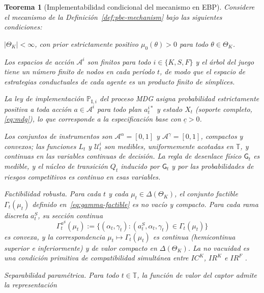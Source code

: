 \documentclass[review,authoryear,12pt]{elsarticle}
\theoremstyle{plain}
\newtheorem{theorem}{Teorema}
\theoremstyle{definition}
\newcommand{\ThetaK}{\Theta_K}
\newcommand{\1}{\mathbf{1}}
\newcommand{\ProbI}[1]{\mathbb{P}_{\mathrm{I},#1}}
\begin{document}
\begin{theorem}[Implementabilidad condicional del mecanismo en EBP]\label{thm:ebp-implementabilidad}
\normalfont
Considere el mecanismo de la Definición~\ref{def:pbe-mechanism} bajo las siguientes condiciones:
\begin{list}{}{\setlength{\labelwidth}{2.6em}\setlength{\labelsep}{0.7em}\setlength{\leftmargin}{3.3em}\setlength{\itemindent}{0pt}\setlength{\listparindent}{0pt}\setlength{\parsep}{0pt}\setlength{\itemsep}{0.35\baselineskip}}
  \item[\textup{(i)}] $|\ThetaK|<\infty$, con prior estrictamente positivo $\mu_0(\theta)>0$ para todo $\theta\in\ThetaK$.
  \item[\textup{(ii)}] Los espacios de acción $\mathcal{A}^i$ son finitos para todo $i\in\{K,S,F\}$ y el árbol del juego tiene un número finito de nodos en cada período $t$, de modo que el espacio de estrategias conductuales de cada agente es un producto finito de símplices.
  \item[\textup{(iii)}] La ley de implementación $\ProbI{i}$ del proceso MDG asigna probabilidad estrictamente positiva a toda acción $a\in\mathcal{A}^i$ para todo plan $a_t^{i\ast}$ y estado $X_t$ \textup{(}soporte completo, \eqref{eq:mdg}\textup{)}, lo que corresponde a la especificación base con $\underline{c}>0$.
  \item[\textup{(iv)}] Los conjuntos de instrumentos son $\mathcal{A}^{\alpha}=[0,1]$ y $\mathcal{A}^{\gamma}=[0,1]$, compactos y convexos; las funciones $L_t$ y $\mathcal{U}_t^i$ son medibles, uniformemente acotadas en $\mathbb{T}$, y continuas en las variables continuas de decisión. La regla de desenlace físico $\mathsf{G}_t$ es medible, y el núcleo de transición $Q_t$ inducido por $\mathsf{G}_t$ y por las probabilidades de riesgos competitivos es continuo en esas variables.
  \item[\textup{(v)}] Factibilidad robusta. Para cada $t$ y cada $\mu_t\in\Delta(\ThetaK)$, el conjunto factible $\Gamma_t(\mu_t)$ definido en~\eqref{eq:gamma-factible} es no vacío y compacto. Para cada rama discreta $a_t^S$, su sección continua
  \[
  \Gamma_t^{a^S}(\mu_t):=\{(\alpha_t,\gamma_t):(a_t^S,\alpha_t,\gamma_t)\in\Gamma_t(\mu_t)\}
  \]
  es convexa, y la correspondencia $\mu_t\mapsto\Gamma_t(\mu_t)$ es continua \textup{(}hemicontinua superior e inferiormente\textup{)} y de valor compacto en $\Delta(\ThetaK)$. La no vacuidad es una condición primitiva de compatibilidad simultánea entre $IC^K$, $IR^K$ e $IR^F$ \citep{KadanRenySwinkels2017}.
  \item[\textup{(vi)}] Separabilidad paramétrica. Para todo $t\in\mathbb{T}$, la función de valor del captor admite la representación

\end{list}
\end{theorem}
\end{document}
